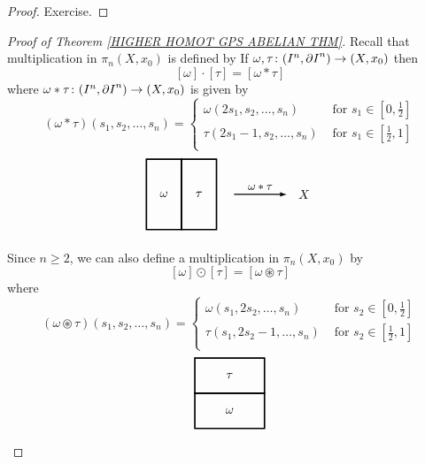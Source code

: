 \begin{proof}
Exercise.
\end{proof}


\begin{proof}[Proof of Theorem \ref{HIGHER HOMOT GPS ABELIAN THM}]
Recall that  multiplication in $\pi_{n}(X, x_{0})$ is defined by 
If $\omega, \tau\colon (I^{n}, {\partial I}^{n}) \to (X, x_{0})$ then 
\[[\omega]\cdot [\tau] = [\omega\ast\tau]\]
where $\omega\ast\tau\colon (I^{n}, {\partial I}^{n}) \to (X, x_{0})$ is given by 
\[
(\omega\ast \tau)(s_{1}, s_{2}, \dots, s_{n}) = 
\begin{cases}
\omega(2s_{1}, s_{2}, \dots, s_{n}) & \text{ for } s_{1}\in [0, \frac{1}{2}] \\
\tau(2s_{1} -1, s_{2}, \dots, s_{n}) & \text{ for } s_{1}\in [\frac{1}{2}, 1] \\
\end{cases}
\] 
\begin{equation*}
\begin{tikzpicture}
\draw[very thick] (0,0) rectangle  node[anchor=center] {$\omega$} (1,2);
\draw[very thick] (1,0) rectangle node[anchor=center] {$\tau$}(2,2);

\draw[thick, ->, >=latex] (2.5, 1) -- node[anchor=south] 
{\small $\omega\ast\tau$} (4.0,1);
\node at (4.5, 1) {$X$};
\end{tikzpicture}
\end{equation*}

Since $n\geq 2$, we can also define a multiplication in $\pi_{n}(X, x_{0})$
by 
\[
[\omega]\odot [\tau] = [\omega\circledast\tau]
\]
where
\[
(\omega\circledast \tau)(s_{1}, s_{2}, \dots, s_{n}) = 
\begin{cases}
\omega(s_{1}, 2s_{2}, \dots, s_{n}) & \text{ for } s_{2}\in [0, \frac{1}{2}] \\
\tau(s_{1}, 2s_{2} - 1, \dots, s_{n}) & \text{ for } s_{2}\in [\frac{1}{2}, 1] \\
\end{cases}
\]
\begin{equation*}
\begin{tikzpicture}
\draw[very thick] (0,0) rectangle  node[anchor=center] {$\omega$} (2,1);
\draw[very thick] (0,1) rectangle node[anchor=center] {$\tau$}(2,2);


\end{tikzpicture}
\end{equation*}
\end{proof}
